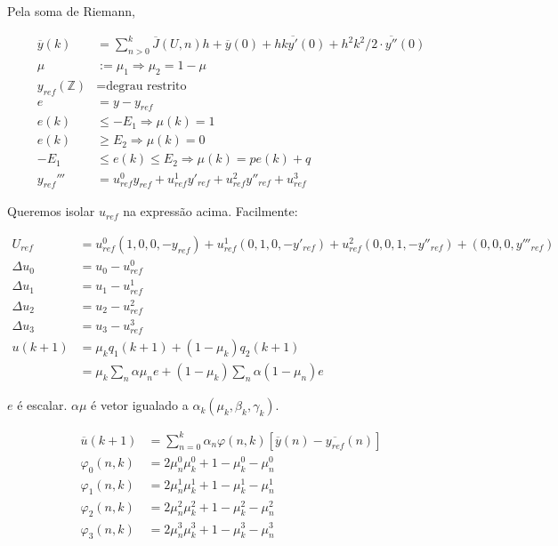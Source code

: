 \documentclass[12pt]{article}
\begin{document}
Pela soma de Riemann,

\begin{align}
  \overline{y}(k) &= \sum_{n > 0}^k \overline{J}(U,n) h + \overline{y}(0) + hk \overline{y'}(0) + h^2k^2/2\cdot \overline{y''}(0) \\
  \mu &:= \mu_1 \Rightarrow \mu_2 = 1 - \mu \\
  y_{ref}(\mathbb{Z}) &= \text{degrau restrito} \\
  e &= y - y_{ref} \\
  e(k) &\le - E_1 \Rightarrow \mu(k) = 1 \\
  e(k) &\ge E_2 \Rightarrow \mu(k) = 0 \\
  - E_1 &\le e(k) \le E_2 \Rightarrow \mu(k) = p e(k) + q \\
  y_{ref}''' &= u^0_{ref} y_{ref} + u^1_{ref} y'_{ref} + u^2_{ref} y''_{ref} + u^3_{ref}
  \end{align}

Queremos isolar $u_{ref}$ na express\~ao acima. Facilmente:

\begin{align}
  U_{ref} &= u^0_{ref}(1,0,0,-y_{ref}) + u^1_{ref}(0,1,0,-y'_{ref}) + u^2_{ref}(0,0,1,-y''_{ref}) + (0,0,0,y'''_{ref}) \\
  \Delta u_0 &= u_0 - u^0_{ref} \\
  \Delta u_1 &= u_1 - u^1_{ref} \\
  \Delta u_2 &= u_2 - u^2_{ref} \\
  \Delta u_3 &= u_3 - u^3_{ref} \\
u(k+1) &= \mu_k q_1(k+1) + (1 - \mu_k) q_2(k+1) \\
&= \mu_k \sum_n \alpha \mu_n e + (1 - \mu_k) \sum_n \alpha (1 - \mu_n) e
\end{align}

$e$ \'e escalar. $\alpha \mu$ \'e vetor igualado a $\alpha_k(\mu_k, \beta_k, \gamma_k)$.

\begin{align}
\overline{u}(k+1) &= \sum_{n = 0}^k \alpha_n \varphi(n,k) [\overline{y}(n) - \overline{y_{ref}}(n)] \\
\varphi_0(n, k) &= 2 \mu_n^0 \mu_k^0 + 1 - \mu_k^0 - \mu_n^0 \\
\varphi_1(n, k) &= 2 \mu_n^1 \mu_k^1 + 1 - \mu_k^1 - \mu_n^1 \\
\varphi_2(n, k) &= 2 \mu_n^2 \mu_k^2 + 1 - \mu_k^2 - \mu_n^2 \\
\varphi_3(n, k) &= 2 \mu_n^3 \mu_k^3 + 1 - \mu_k^3 - \mu_n^3
\end{align}
\end{document}
